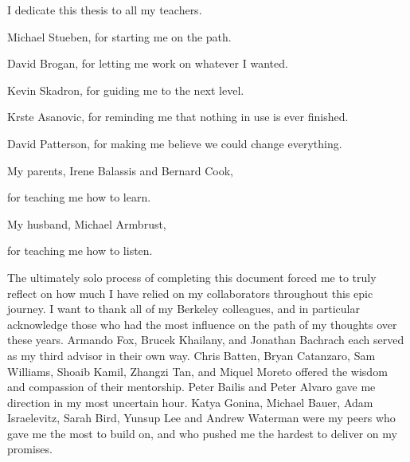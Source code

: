 \documentclass[12pt]{myucthesis}
\begin{document}
\hypersetup{pageanchor=true}
\begin{frontmatter}

\begin{dedication}
\null\vfil
{\large
\begin{center}
I dedicate this thesis to all my teachers.
\vspace{1in}

Michael Stueben, for starting me on the path.

David Brogan, for letting me work on whatever I wanted.

Kevin Skadron, for guiding me to the next level.

Krste Asanovic, for reminding me that nothing in use is ever finished.

David Patterson, for making me believe we could change everything.
\vspace{1in}

My parents, Irene Balassis and Bernard Cook,

for teaching me how to learn.
\vspace{1in}

My husband, Michael Armbrust,

for teaching me how to listen.

\end{center}}
\null\vfil
\end{dedication}

\tableofcontents
\listoffigures %
\listoftables %


\begin{acknowledgements}

The ultimately solo process of completing this document forced me to truly reflect
on how much I have relied on my collaborators throughout this epic journey.
I want to thank all of my Berkeley colleagues, and in particular acknowledge
those who had the most influence on the path of my thoughts over these years.
Armando Fox, Brucek Khailany, and Jonathan Bachrach each served as my third advisor in their own way.
Chris Batten, Bryan Catanzaro, Sam Williams, Shoaib Kamil, Zhangzi Tan, and Miquel Moreto
offered the wisdom and compassion of their mentorship.
Peter Bailis and Peter Alvaro gave me direction in my most uncertain hour.
Katya Gonina, Michael Bauer, Adam Israelevitz,
Sarah Bird, Yunsup Lee and Andrew Waterman
were my peers who gave me the most to build on,
and who pushed me the hardest to deliver on my promises.


\end{acknowledgements}
\end{frontmatter}
\end{document}
